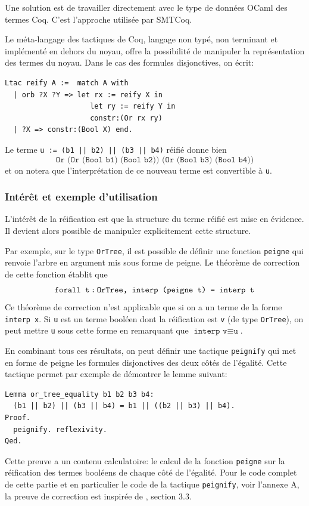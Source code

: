 \documentclass[11pt]{article}
\begin{document}
Une solution est de travailler directement avec le type de données OCaml des termes Coq. C'est l'approche utilisée par SMTCoq. \medbreak

Le méta-langage des tactiques de Coq, langage non typé, non terminant et implémenté en dehors du noyau, offre la possibilité de manipuler la représentation des termes du noyau. Dans le cas des formules disjonctives, on écrit:
\begin{lstlisting}[frame=single]
Ltac reify A :=  match A with
  | orb ?X ?Y => let rx := reify X in
                    let ry := reify Y in
                    constr:(Or rx ry)
  | ?X => constr:(Bool X) end.

\end{lstlisting}
Le terme \texttt{u := (b1 || b2) || (b3 || b4)} réifié donne bien 
\[\texttt{Or (Or (Bool b1) (Bool b2)) (Or (Bool b3) (Bool b4))}\] 
et on notera que l'interprétation de ce nouveau terme est convertible à \texttt{u}.




\subsubsection{Intérêt et exemple d'utilisation} \label{interet_reification}

L'intérêt de la réification est que la structure du terme réifié est mise en évidence. Il devient alors possible de manipuler explicitement cette structure. \medbreak

Par exemple, sur le type \texttt{OrTree}, il est possible de définir une fonction \texttt{peigne} qui renvoie l'arbre en argument mis sous forme de peigne. Le théorème de correction de cette fonction établit que
\[ \texttt{forall t\,:\,OrTree, interp (peigne t) = interp t} \]
Ce théorème de correction n'est applicable que si on a un terme de la forme \texttt{interp x}. Si \texttt{u} est un terme booléen dont la réification est \texttt{v} (de type \texttt{OrTree}), on peut mettre \texttt{u} sous cette forme en remarquant que $\texttt{interp v}\equiv\texttt{u}$. \medbreak

En combinant tous ces résultats, on peut définir une tactique \texttt{peignify} qui met en forme de peigne les formules disjonctives des deux côtés de l'égalité. Cette tactique permet par exemple de démontrer le lemme suivant: 
\begin{lstlisting}[frame=single]
Lemma or_tree_equality b1 b2 b3 b4:
  (b1 || b2) || (b3 || b4) = b1 || ((b2 || b3) || b4).
Proof.
  peignify. reflexivity.
Qed.
\end{lstlisting}
Cette preuve a un contenu calculatoire: le calcul de la fonction \texttt{peigne} sur la réification des termes booléens de chaque côté de l'égalité. Pour le code complet de cette partie et en particulier le code de la tactique \texttt{peignify}, voir l'annexe A, la preuve de correction est inspirée de \cite{coq_intro}, section 3.3.
\end{document}
